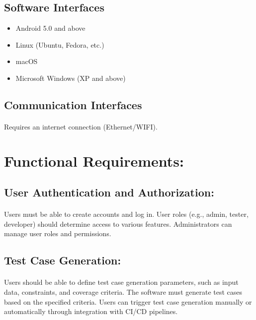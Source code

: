 \documentclass{article}
\begin{document}
\subsection{Software Interfaces}
\begin{itemize}
    \item Android 5.0 and above
    \item Linux (Ubuntu, Fedora, etc.)
    \item macOS
    \item Microsoft Windows (XP and above)
\end{itemize}

\subsection{Communication Interfaces}
\paragraph{}
Requires an internet connection (Ethernet/WIFI).


\section{Functional Requirements:}
\subsection{User Authentication and Authorization:}
\paragraph{}
Users must be able to create accounts and log in.
User roles (e.g., admin, tester, developer) should determine access to various features.
Administrators can manage user roles and permissions.

\subsection{Test Case Generation:}
\paragraph{}
Users should be able to define test case generation parameters, such as input data,
constraints, and coverage criteria. The software must generate test cases based on the
specified criteria. Users can trigger test case generation manually or automatically
through integration with CI/CD pipelines.
\end{document}
